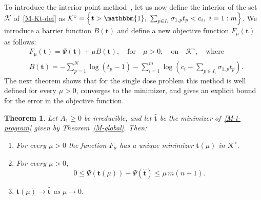 \documentclass[11pt]{article}
\theoremstyle{plain}
\newtheorem{theorem}{Theorem}[section]
\theoremstyle{remark}
\numberwithin{equation}{section}
\begin{document}
To introduce the interior point method~\cite[Chapter 11]{2004Boyd_Vandenberghe}, let us now define the interior of the set $\mathcal{K}$ of~\eqref{M-Kt-def} as
$\mathcal{K}^\circ=\left\{\bm t>\mathbbm{1},\ \sum_{p\in I_i}\sigma_{1,p}t_p<c_i,\ i=1:m\right\}$. We introduce a barrier function $B(\bm{t})$ and define a new objective function
$F_\mu(\bm{t})$ as follows:
\begin{equation}\label{psi-hat}
  \begin{aligned}
&F_\mu(\bm{t})=\Psi(\bm{t})+\mu B(\bm{t}), \quad\mbox{for}\quad \mu>0, \quad \mbox{on}\quad \mathcal{K}^\circ, \quad\mbox{where}\\
&B(\bm t)=-\sum_{p=1}^{N}\log\left(t_p-1\right)
-\sum_{i=1}^{m}\log\left(c_i-\sum_{p\in I_i}\sigma_{1,p}t_p\right).
  \end{aligned}
\end{equation}
The next theorem shows that for the
single dose problem this method is well defined for every $\mu>0$, converges to
the minimizer, and gives an explicit bound for the error in the objective
function.
\begin{theorem}\label{barrier}
Let $A_1\ge 0$ be irreducible, and let $\widehat{\bm t}$ be the minimizer
of~\eqref{M-t-program} given by Theorem~\ref{M-global}. Then:
\begin{enumerate}
\renewcommand{\labelenumi}{(\roman{enumi})}
\item For every $\mu>0$ the function $F_\mu$ has a unique minimizer
$\bm t(\mu)$ in $\mathcal{K}^\circ$.
\item For every $\mu>0$,
\begin{equation}\label{gap}
0\le\Psi\left(\bm t(\mu)\right)-\Psi\left(\widehat{\bm t}\right)\le\mu\,m(n+1).
\end{equation}
\item $\bm t(\mu)\to\widehat{\bm t}$ as $\mu\to 0$.
\end{enumerate}
\end{theorem}
\end{document}
